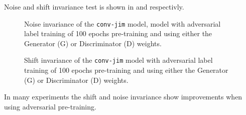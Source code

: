 Noise and shift invariance test is shown in  and  respectivly.
\begin{figure}[!ht]
  \centering
  \caption{Noise invariance of the \texttt{conv-jim} model,  model with adversarial label training of 100 epochs pre-training and using either the Generator (G) or Discriminator (D) weights.}
  \label{fig:exp_adv_label_tb_noise_conv-jim}
\end{figure}
\FloatBarrier
\noindent
\begin{figure}[!ht]
  \centering
  \caption{Shift invariance of the \texttt{conv-jim} model with adversarial label training of 100 epochs pre-training and using either the Generator (G) or Discriminator (D) weights.}
  \label{fig:exp_adv_label_tb_shift_conv-jim}
\end{figure}
\FloatBarrier
\noindent
In many experiments the shift and noise invariance show improvements when using adversarial pre-training. 



